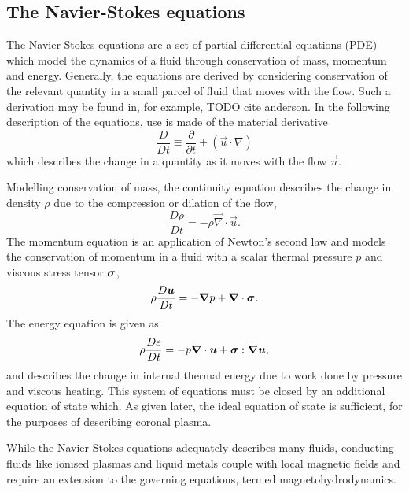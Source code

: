\subsection{The Navier-Stokes equations}

The Navier-Stokes equations are a set of partial differential equations (PDE) which model the dynamics of a fluid through conservation of mass, momentum and energy. Generally, the equations are derived by considering conservation of the relevant quantity in a small parcel of fluid that moves with the flow. Such a derivation may be found in, for example, TODO cite anderson. In the following description of the equations, use is made of the material derivative
\begin{equation}
  \label{eq:material_derivative}
  \frac{D}{Dt} \equiv \frac{\partial}{\partial t} + (\vec{u} \cdot \nabla)
\end{equation}
which describes the change in a quantity as it moves with the flow $\vec{u}$.

Modelling conservation of mass, the continuity equation describes the change in density $\rho$ due to the compression or dilation of the flow,
\begin{equation}
\frac{D\rho}{Dt} = - \rho \vec{\nabla} \cdot \vec{u}.
\label{eq:ns_continuity}
\end{equation}
The momentum equation is an application of Newton's second law and models the conservation of momentum in a fluid with a scalar thermal pressure $p$ and viscous stress tensor ${\bm \sigma}$,
\begin{equation}
\rho\frac{D{\bm u}}{Dt} = -{\bm \nabla} p + {\bm \nabla} \cdot {\bm \sigma}.
\label{eq:ns_momentum}
\end{equation}
The energy equation is given as
\begin{equation}
\rho\frac{D\varepsilon}{Dt} = -p {\bm \nabla} \cdot {\bm u} + {\bm \sigma} : {\bm \nabla}{\bm u},
\label{eq:ns_energy}
\end{equation}
and describes the change in internal thermal energy due to work done by pressure and viscous heating. This system of equations must be closed by an additional equation of state which. As given later, the ideal equation of state is sufficient, for the purposes of describing coronal plasma.

While the Navier-Stokes equations adequately describes many fluids, conducting fluids like ionised plasmas and liquid metals couple with local magnetic fields and require an extension to the governing equations, termed magnetohydrodynamics.

